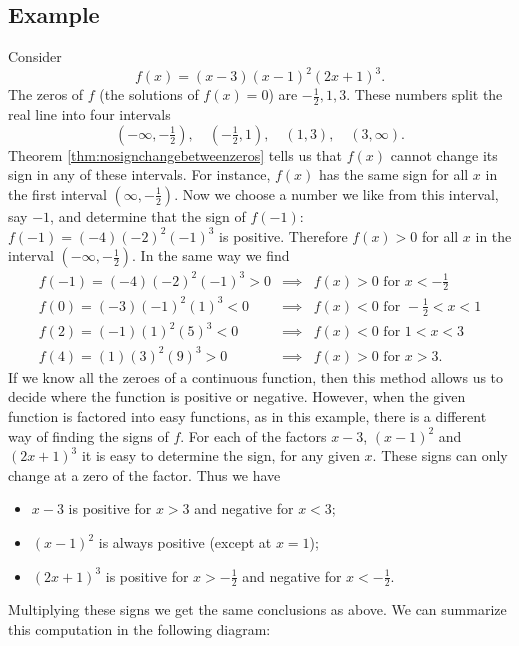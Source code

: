 \subsection{Example} %
Consider
\[
f(x) = (x-3)(x-1)^2(2x+1)^3.
\]
The zeros of $f$ (the solutions of $f(x)=0$) are $ -\frac12, 1, 3 $.
These numbers split the real line into four intervals
\[
(-\infty, -\tfrac12), \quad (-\tfrac12, 1), \quad (1, 3),\quad (3, \infty).
\]
Theorem \ref{thm:nosignchangebetweenzeros} tells us that $f(x)$ cannot change
its sign in any of these intervals.  For instance, $f(x)$ has the same sign for
all $x$ in the first interval $(\infty, -\frac12)$.  Now we choose a number we
like from this interval, say $-1$, and determine that the sign of $f(-1)$:
$f(-1) =(-4)(-2)^2(-1)^3$ is positive.  Therefore $f(x) >0$ for all $x$ in the
interval $(-\infty, -\tfrac12)$.  In the same way we find
\begin{eqnarray*}
  f(-1) = (-4)(-2)^2(-1)^3>0 &\implies & f(x) >0 \text{ for } x<-\tfrac12\\
  f( 0) = (-3)(-1)^2( 1)^3<0 &\implies & f(x) <0 \text{ for } -\tfrac12<x<1\\
  f( 2) = (-1)( 1)^2( 5)^3<0 &\implies & f(x) <0 \text{ for } 1<x<3\\
  f( 4) = ( 1)( 3)^2( 9)^3>0 &\implies & f(x) >0 \text{ for } x>3.
\end{eqnarray*}
If we know all the zeroes of a continuous function, then this method allows us
to decide where the function is positive or negative.  However, when the given
function is factored into easy functions, as in this example, there is a
different way of finding the signs of $f$.  For each of the factors $x-3$,
$(x-1)^2$ and $(2x+1)^3$ it is easy to determine the sign, for any given $x$.
These signs can only change at a zero of the factor.  Thus we have
\begin{itemize}
\item $x-3$ is positive for $x>3$ and negative for $x<3$;
\item $(x-1)^2$ is always positive (except at $x=1$);
\item $(2x+1)^3$ is positive for $x>-\frac12$ and negative for $x<-\frac12$.
\end{itemize}
Multiplying these signs we get the same conclusions as above. We can summarize
this computation in the following diagram:
\begin{figure}[h]
  \centering\sffamily
  
\end{figure}
















